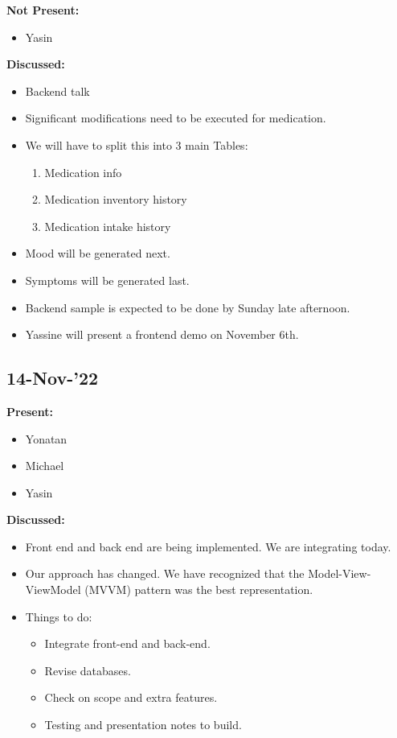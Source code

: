 \documentclass[11pt]{article}
\begin{document}
    \textbf{Not Present:}

    \begin{itemize}
        \item Yasin
    \end{itemize}

    \textbf{Discussed:}
    \begin{itemize}
        \item Backend talk
        \item Significant modifications need to be executed for medication.
        \item We will have to split this into 3 main Tables:
        \begin{enumerate}
            \item Medication info
            \item Medication inventory history
            \item Medication intake history
        \end{enumerate}
        \item Mood will be generated next.
        \item Symptoms will be generated last.
        \item Backend sample is expected to be done by Sunday late afternoon.
        \item Yassine will present a frontend demo on November 6th.
    \end{itemize}

    \subsection{14-Nov-’22}\label{subsec:14-nov-22}

    \textbf{Present:}
    \begin{itemize}
        \item Yonatan
        \item Michael
        \item Yasin
    \end{itemize}

    \textbf{Discussed:}
    \begin{itemize}
        \item  Front end and back end are being implemented.
        We are integrating today.
        \item  Our approach has changed.
        We have recognized that the Model-View-ViewModel (MVVM) pattern was the best representation.
        \item Things to do:
        \begin{itemize}
            \item Integrate front-end and back-end.
            \item Revise databases.
            \item Check on scope and extra features.
            \item Testing and presentation notes to build.
        \end{itemize}
    \end{itemize}
\end{document}
